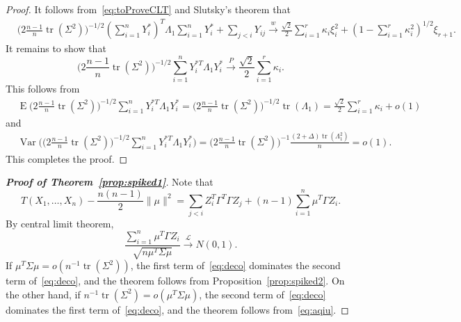 \documentclass[3p]{elsarticle}
\DeclareMathOperator{\mytr}{tr}
\DeclareMathOperator{\myE}{E}
\DeclareMathOperator{\myVar}{Var}
\theoremstyle{plain}
\theoremstyle{definition}
\theoremstyle{remark}
\begin{document}
\begin{proof}
    It follows from~\eqref{eq:toProveCLT} and Slutsky's theorem that
    $$
    \begin{aligned}
        &\big(2\frac{n-1}{n}\mytr(\Sigma^2)\big)^{-1/2}(\sum_{i=1}^n  Y_i^*)^T \Lambda_1 \sum_{i=1}^n  Y_i^*
        +
        \sum_{j<i} Y_{ij}
        \xrightarrow{w} \frac{\sqrt{2}}{2}\sum_{i=1}^r \kappa_i \xi_i^2+ (1-\sum_{i=1}^r \kappa_i^2)^{1/2}\xi_{r+1}.
    \end{aligned}
    $$
    It remains to show that
        $$
        \big(2\frac{n-1}{n}\mytr(\Sigma^2)\big)^{-1/2}
        \sum_{i=1}^n Y_i^{*T}\Lambda_1 Y_i^*
      \xrightarrow{P}\frac{\sqrt{2}}{2}\sum_{i=1}^r \kappa_i.
        $$
        This follows from
        $$
        \begin{aligned}
            &\myE
        \big(2\frac{n-1}{n}\mytr(\Sigma^2)\big)^{-1/2}
        \sum_{i=1}^n Y_i^{*T}\Lambda_1 Y_i^*
            =
        \big(2\frac{n-1}{n}\mytr(\Sigma^2)\big)^{-1/2}\mytr(\Lambda_1)
            =\frac{\sqrt{2}}{2}\sum_{i=1}^r \kappa_i+o(1)
        \end{aligned}
        $$
        and
        $$
        \begin{aligned}
            &\myVar\Big(
        \big(2\frac{n-1}{n}\mytr(\Sigma^2)\big)^{-1/2}
        \sum_{i=1}^n Y_i^{*T}\Lambda_1 Y_i^*
            \Big)
            =\big(2\frac{n-1}{n}\mytr(\Sigma^2)\big)^{-1} \frac{(2+\Delta)\mytr(\Lambda_1^2)}{n}=o(1).
        \end{aligned}
        $$
        This completes the proof.
    
\end{proof}


\begin{proof}[\textbf{Proof of Theorem~\ref{prop:spiked1}}]
    Note that
    \begin{equation}\label{eq:deco}
        {T(X_1,\ldots,X_n)-\frac{n(n-1)}{2}\|\mu\|^2}
    =
        {\sum_{j<i} Z_i^T \Gamma^T \Gamma Z_j}
    +
        {(n-1) \sum_{i=1}^n \mu^T \Gamma Z_i}.
    \end{equation}
    By central limit theorem,
        \begin{equation}\label{eq:aqiu}
        \frac{ \sum_{i=1}^n \mu^T \Gamma Z_i}
        {\sqrt{n\mu^T \Sigma \mu}}
        \xrightarrow{\mathcal{L}}N(0,1).
        \end{equation}
    If $\mu^T \Sigma \mu=o(n^{-1}\mytr(\Sigma^2))$, the first term of~\eqref{eq:deco} dominates the second term of~\eqref{eq:deco}, and the theorem follows from Proposition~\ref{prop:spiked2}.
    On the other hand, if $n^{-1}\mytr(\Sigma^2)=o(\mu^T \Sigma \mu)$, the second term of~\eqref{eq:deco} dominates the first term of~\eqref{eq:deco}, and the theorem follows from~\eqref{eq:aqiu}.



\end{proof}
\end{document}
